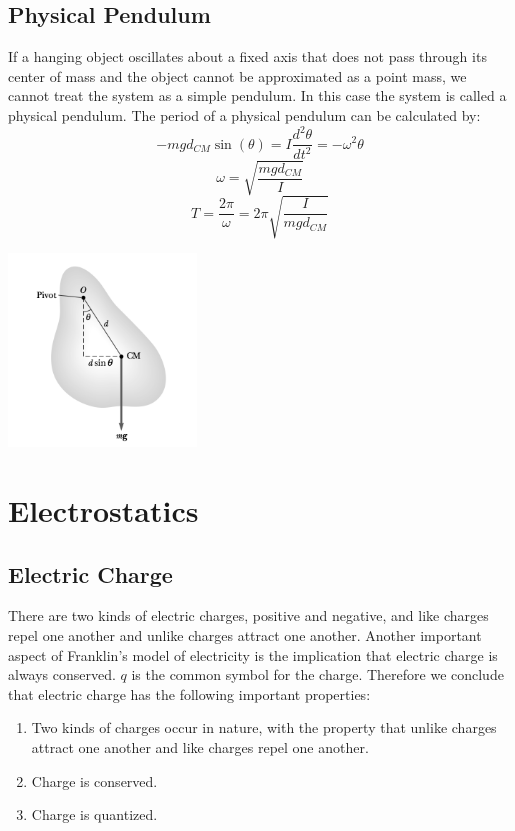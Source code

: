 \documentclass{article}
\begin{document}
\subsection{Physical Pendulum}
\begin{multicols}{2}
  If a hanging object oscillates about a fixed axis that does not pass through its center of mass and the object cannot be approximated as a point mass, we cannot treat the system as a simple pendulum. In this case the system is called a physical pendulum. The period of a physical pendulum can be calculated by:
  \[
  -mgd_{CM}\sin(\theta)=I\frac{d^2\theta}{dt^2}=-\omega^2\theta
  \]
  \[
  \omega=\sqrt{\frac{mgd_{CM}}{I}}
  \]
  \[
  T=\frac{2\pi}{\omega}=2\pi\sqrt{\frac{I}{mgd_{CM}}}
  \]        	\centerline{\includegraphics[width=5cm]{phyPen.png}}
\end{multicols}

\section{Electrostatics}
\subsection{Electric Charge}
There are two kinds of electric charges, positive and negative, and like charges repel one another and unlike charges attract one another. Another important aspect of Franklin’s model of electricity is the implication that electric charge is always conserved. $q$ is the common symbol for the charge. Therefore we conclude that electric charge has the following important properties:\\
\begin{enumerate}
\item Two kinds of charges occur in nature, with the property that unlike charges attract one another and like charges repel one another.
\item Charge is conserved.
\item Charge is quantized.
\end{enumerate}
\end{document}
